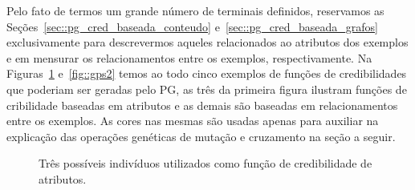 Pelo fato de termos um grande número de terminais definidos, reservamos as Seções~\ref{sec::pg_cred_baseada_conteudo} e~\ref{sec::pg_cred_baseada_grafos} exclusivamente para descrevermos aqueles relacionados ao atributos dos exemplos e em mensurar os relacionamentos entre os exemplos, respectivamente. Na Figuras~\ref{fig::gps1} e~\ref{fig::gps2} temos ao todo cinco exemplos de funções de credibilidades que poderiam ser geradas pelo \textsc{PG}, as três da primeira figura ilustram funções de cribilidade baseadas em atributos e as demais são baseadas em relacionamentos entre os exemplos. As cores nas mesmas são usadas apenas para auxiliar na explicação das operações genéticas de mutação e cruzamento na seção a seguir.

\begin{figure}[ht]
\centering
{}
\caption{Três possíveis indivíduos utilizados como função de credibilidade de atributos.}
\label{fig::gps1}
\end{figure}


